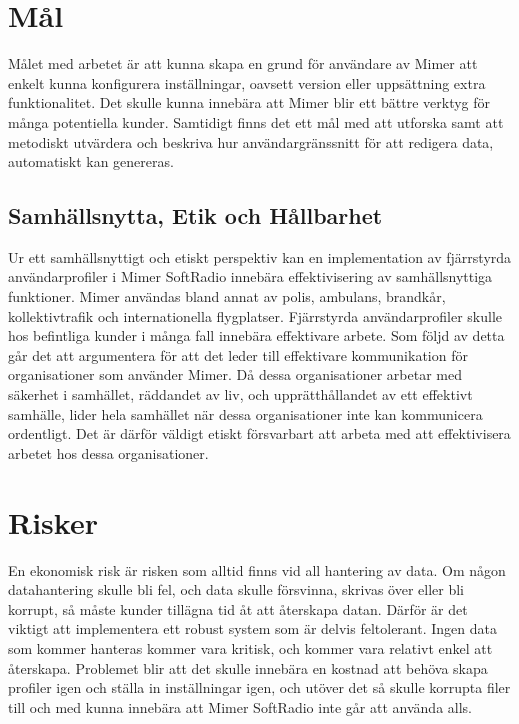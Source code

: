 \section{Mål}
\label{sec:intro:mål}
Målet med arbetet är att kunna skapa en grund för användare av Mimer att enkelt kunna konfigurera inställningar, oavsett version eller uppsättning extra funktionalitet. Det skulle kunna innebära att Mimer blir ett bättre verktyg för många potentiella kunder. Samtidigt finns det ett mål med att utforska samt att metodiskt utvärdera och beskriva hur användargränssnitt för att redigera data, automatiskt kan genereras.

\subsection{Samhällsnytta, Etik och Hållbarhet}

Ur ett samhällsnyttigt och etiskt perspektiv kan en implementation av fjärrstyrda användarprofiler i Mimer SoftRadio innebära effektivisering av samhällsnyttiga funktioner. Mimer användas bland annat av polis, ambulans, brandkår, kollektivtrafik och internationella flygplatser. Fjärrstyrda användarprofiler skulle hos befintliga kunder i många fall innebära effektivare arbete. Som följd av detta går det att argumentera för att det leder till effektivare kommunikation för organisationer som använder Mimer. Då dessa organisationer arbetar med säkerhet i samhället, räddandet av liv, och upprätthållandet av ett effektivt samhälle, lider hela samhället när dessa organisationer inte kan kommunicera ordentligt. Det är därför väldigt etiskt försvarbart att arbeta med att effektivisera arbetet hos dessa organisationer.

\section{Risker}
\label{sec:intro:risker}
En ekonomisk risk är risken som alltid finns vid all hantering av data. Om någon datahantering skulle bli fel, och data skulle försvinna, skrivas över eller bli korrupt, så måste kunder tillägna tid åt att återskapa datan. Därför är det viktigt att implementera ett robust system som är delvis feltolerant. Ingen data som kommer hanteras kommer vara kritisk, och kommer vara relativt enkel att återskapa. Problemet blir att det skulle innebära en kostnad att behöva skapa profiler igen och ställa in inställningar igen, och utöver det så skulle korrupta filer till och med kunna innebära att Mimer SoftRadio inte går att använda alls.

